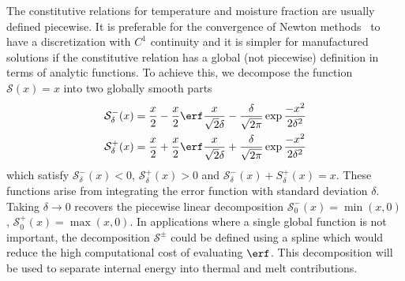 The constitutive relations for temperature and moisture fraction are usually defined piecewise.
It is preferable for the convergence of Newton methods~\citep[\cf][]{gropp2000globalized} to have a discretization with $C^1$ continuity and it is simpler for manufactured solutions if the constitutive relation has a global (\ie not piecewise) definition in terms of analytic functions.
To achieve this, we decompose the function $\mathcal{S}(x) = x$ into two globally smooth parts
\begin{equation}\label{eq:vhttransition}
  \begin{split}
    \mathcal S_\delta^-(x) &= \frac{x}{2} - \frac{x}{2} \erf \frac{x}{\sqrt 2 \delta} - \frac{\delta}{\sqrt{2\pi}} \exp{\frac{-x^{2}}{2 \delta^{2}}} \\
    \mathcal S_\delta^+(x) &= \frac{x}{2} + \frac{x}{2} \erf \frac{x}{\sqrt 2 \delta} + \frac{\delta}{\sqrt{2\pi}} \exp{\frac{-x^{2}}{2 \delta^{2}}}
  \end{split}
\end{equation}
which satisfy $\mathcal S_\delta^- (x) < 0$, $\mathcal S_\delta^+(x) > 0$ and $\mathcal S_\delta^-(x) + S_\delta^+(x) = x$.
These functions arise from integrating the error function with standard deviation $\delta$.
Taking $\delta\to 0$ recovers the piecewise linear decomposition $\mathcal S_0^-(x) = \min(x,0)$, $\mathcal S_0^+(x) = \max(x,0)$.
In applications where a single global function is not important, the decomposition $\mathcal S^\pm$ could be defined using a spline which would reduce the high computational cost of evaluating $\erf$.
This decomposition will be used to separate internal energy into thermal and melt contributions.

